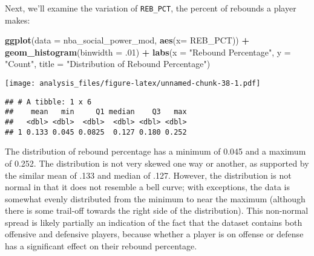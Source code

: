 \documentclass[]{article}
\newenvironment{Shaded}{\begin{snugshade}}{\end{snugshade}}
\newcommand{\DataTypeTok}[1]{\textcolor[rgb]{0.13,0.29,0.53}{#1}}
\newcommand{\FloatTok}[1]{\textcolor[rgb]{0.00,0.00,0.81}{#1}}
\newcommand{\KeywordTok}[1]{\textcolor[rgb]{0.13,0.29,0.53}{\textbf{#1}}}
\newcommand{\NormalTok}[1]{#1}
\newcommand{\OperatorTok}[1]{\textcolor[rgb]{0.81,0.36,0.00}{\textbf{#1}}}
\newcommand{\StringTok}[1]{\textcolor[rgb]{0.31,0.60,0.02}{#1}}
\begin{document}
Next, we'll examine the variation of \texttt{REB\_PCT}, the percent of
rebounds a player makes:

\begin{Shaded}
\begin{Highlighting}[]
\KeywordTok{ggplot}\NormalTok{(}\DataTypeTok{data =}\NormalTok{ nba_social_power_mod, }\KeywordTok{aes}\NormalTok{(}\DataTypeTok{x=}\NormalTok{ REB_PCT)) }\OperatorTok{+}\StringTok{ }
\StringTok{  }\KeywordTok{geom_histogram}\NormalTok{(}\DataTypeTok{binwidth =} \FloatTok{.01}\NormalTok{) }\OperatorTok{+}
\StringTok{  }\KeywordTok{labs}\NormalTok{(}\DataTypeTok{x =} \StringTok{"Rebound Percentage"}\NormalTok{, }\DataTypeTok{y =} \StringTok{"Count"}\NormalTok{,}
       \DataTypeTok{title =} \StringTok{"Distribution of Rebound Percentage"}\NormalTok{)}
\end{Highlighting}
\end{Shaded}

\texttt{[image: analysis\_files/figure-latex/unnamed-chunk-38-1.pdf]}

\begin{Shaded}
\end{Shaded}

\begin{verbatim}
## # A tibble: 1 x 6
##    mean   min     Q1 median    Q3   max
##   <dbl> <dbl>  <dbl>  <dbl> <dbl> <dbl>
## 1 0.133 0.045 0.0825  0.127 0.180 0.252
\end{verbatim}

The distribution of rebound percentage has a minimum of 0.045 and a
maximum of 0.252. The distribution is not very skewed one way or
another, as supported by the similar mean of .133 and median of .127.
However, the distribution is not normal in that it does not resemble a
bell curve; with exceptions, the data is somewhat evenly distributed
from the minimum to near the maximum (although there is some trail-off
towards the right side of the distribution). This non-normal spread is
likely partially an indication of the fact that the dataset contains
both offensive and defensive players, because whether a player is on
offense or defense has a significant effect on their rebound percentage.
\end{document}
